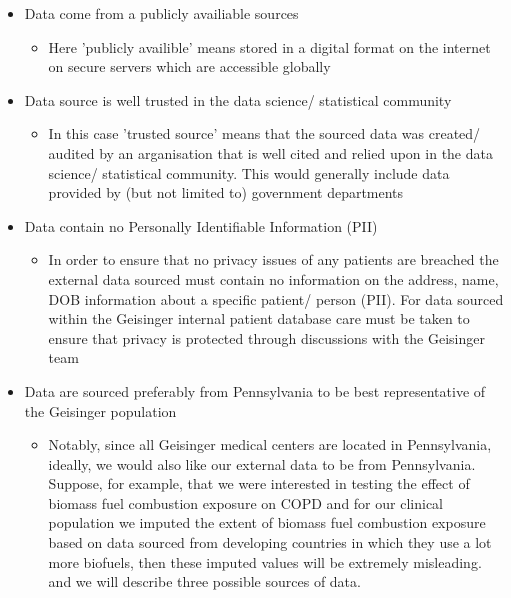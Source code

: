 \documentclass{article}
\begin{document}
\begin{itemize}
  \item Data come from a publicly availiable sources
  \begin{itemize}
    \item Here 'publicly availible' means stored in a digital format on the 
          internet on secure servers which are accessible globally
  \end{itemize}
  \item Data source is well trusted in the data science/ statistical community
  \begin{itemize}
    \item In this case 'trusted source' means that the sourced data was created/ 
          audited by an arganisation that is well cited and relied upon in the 
          data science/ statistical community. This would generally include data
          provided by (but not limited to) government departments
  \end{itemize}
  \item Data contain no Personally Identifiable Information (PII)
  \begin{itemize}
    \item In order to ensure that no privacy issues of any patients are breached
          the external data sourced must contain no information on the address, 
          name, DOB information about a specific patient/ person (PII). For data sourced  
          within the Geisinger internal patient database care must be taken to 
          ensure that privacy is protected through discussions with the Geisinger
          team  
  \end{itemize}
  \item Data are sourced preferably from Pennsylvania to be best representative 
        of the Geisinger population
  \begin{itemize}
    \item Notably, since all Geisinger medical centers are located in 
          Pennsylvania, ideally, we would also like our external data to be from 
          Pennsylvania. Suppose, for example, that we were interested in testing 
          the effect of biomass fuel combustion exposure on COPD and for our 
          clinical population we imputed the extent of biomass fuel combustion 
          exposure based on data sourced from developing countries in which 
          they use a lot more biofuels, then these imputed values will be 
          extremely misleading. and we will describe three possible sources 
          of data.  

\end{itemize}
\end{itemize}
\end{document}
